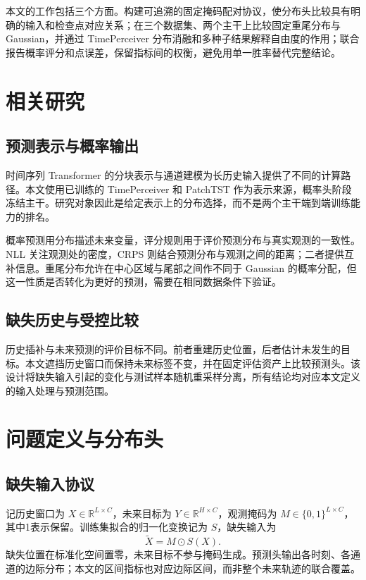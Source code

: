 \documentclass[11pt,a4paper,twocolumn]{article}
\begin{document}
本文的工作包括三个方面。构建可追溯的固定掩码配对协议，使分布头比较具有明确的输入和检查点对应关系；在三个数据集、两个主干上比较固定重尾分布与 Gaussian，并通过 TimePerceiver 分布消融和多种子结果解释自由度的作用；联合报告概率评分和点误差，保留指标间的权衡，避免用单一胜率替代完整结论。

\section{相关研究}
\subsection{预测表示与概率输出}
时间序列 Transformer 的分块表示与通道建模为长历史输入提供了不同的计算路径\cite{patchtst}。本文使用已训练的 TimePerceiver 和 PatchTST 作为表示来源，概率头阶段冻结主干。研究对象因此是给定表示上的分布选择，而不是两个主干端到端训练能力的排名。

概率预测用分布描述未来变量，评分规则用于评价预测分布与真实观测的一致性。NLL 关注观测处的密度，CRPS 则结合预测分布与观测之间的距离；二者提供互补信息\cite{scoring}。重尾分布允许在中心区域与尾部之间作不同于 Gaussian 的概率分配，但这一性质是否转化为更好的预测，需要在相同数据条件下验证。

\subsection{缺失历史与受控比较}
历史插补与未来预测的评价目标不同。前者重建历史位置，后者估计未发生的目标。本文遮挡历史窗口而保持未来标签不变，并在固定评估资产上比较预测头。该设计将缺失输入引起的变化与测试样本随机重采样分离，所有结论均对应本文定义的输入处理与预测范围。

\section{问题定义与分布头}
\subsection{缺失输入协议}
记历史窗口为 $X\in\mathbb{R}^{L\times C}$，未来目标为 $Y\in\mathbb{R}^{H\times C}$，观测掩码为 $M\in\{0,1\}^{L\times C}$，其中1表示保留。训练集拟合的归一化变换记为 $S$，缺失输入为
\begin{equation}
 \widetilde X=M\odot S(X).
\end{equation}
缺失位置在标准化空间置零，未来目标不参与掩码生成。预测头输出各时刻、各通道的边际分布；本文的区间指标也对应边际区间，而非整个未来轨迹的联合覆盖。
\end{document}
